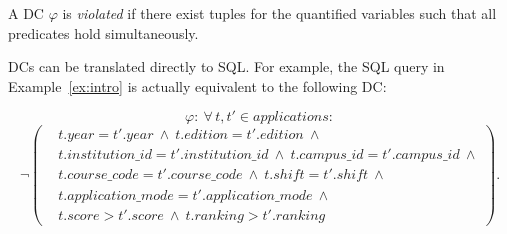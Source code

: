 A DC $\varphi$ is \emph{violated} if there exist tuples for the quantified variables such that all predicates hold simultaneously.

DCs can be translated directly to SQL.
For example,  the SQL query in Example~\ref{ex:intro} is actually equivalent to the following DC:

\begingroup\small
\[
\varphi:\ \forall\, t, t' \in \mathit{applications}:
\]
\[ 
\neg\!\left(
\begin{aligned}
& t.\mathit{year}=t'.\mathit{year}\ \land\ t.\mathit{edition}=t'.\mathit{edition}\ \land \\
& t.\mathit{institution\_id}=t'.\mathit{institution\_id}\ \land\ t.\mathit{campus\_id}=t'.\mathit{campus\_id}\ \land \\
& t.\mathit{course\_code}=t'.\mathit{course\_code}\ \land\ t.\mathit{shift}=t'.\mathit{shift}\ \land \\
& t.\mathit{application\_mode}=t'.\mathit{application\_mode}\ \land \\
& t.\mathit{score}>t'.\mathit{score}\ \land\ t.\mathit{ranking}>t'.\mathit{ranking}
\end{aligned}
\right).
\]
\endgroup

